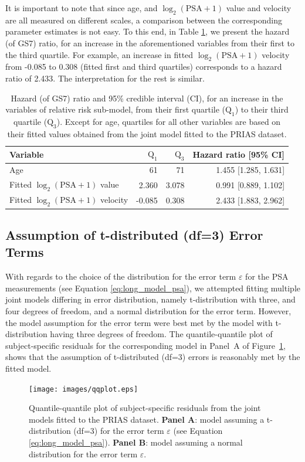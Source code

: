 It is important to note that since age, and ${\log_2 (\mbox{PSA} + 1)}$ value and velocity are all measured on different scales, a comparison between the corresponding parameter estimates is not easy. To this end, in Table \ref{tab:PSA_survival_easy}, we present the hazard (of GS7) ratio, for an increase in the aforementioned variables from their first to the third quartile. For example, an increase in fitted $\log_2 (\mbox{PSA} + 1)$ velocity from -0.085 to 0.308 (fitted first and third quartiles) corresponds to a hazard ratio of 2.433. The interpretation for the rest is similar.

\begin{table}[!htb]
\small\sf\centering
\caption{Hazard (of GS7) ratio and 95\% credible interval (CI), for an increase in the variables of relative risk sub-model, from their first quartile ($\mbox{Q}_1$) to their third quartile ($\mbox{Q}_3$). Except for age, quartiles for all other variables are based on their fitted values obtained from the joint model fitted to the PRIAS dataset.}
\label{tab:PSA_survival_easy}
\begin{tabular}{lrrr}
\hline
Variable                      & $\mbox{Q}_1$   & $\mbox{Q}_3$ & Hazard ratio [95\% CI] \\
\hline
Age & 61 & 71 & 1.455 [1.285, 1.631] \\
Fitted $\log_2 (\mbox{PSA} + 1)$ value & 2.360 & 3.078 & 0.991 [0.889, 1.102] \\
Fitted $\log_2 (\mbox{PSA} + 1)$ velocity & -0.085 & 0.308 & 2.433 [1.883, 2.962] \\
\hline
\end{tabular}
\end{table}

\subsection{Assumption of t-distributed (df=3) Error Terms}
\label{subsec:t-dist-assumption}
With regards to the choice of the distribution for the error term $\varepsilon$ for the PSA measurements (see Equation \ref{eq:long_model_psa}), we attempted fitting multiple joint models differing in error distribution, namely t-distribution with three, and four degrees of freedom, and a normal distribution for the error term. However, the model assumption for the error term were best met by the model with t-distribution having three degrees of freedom. The quantile-quantile plot of subject-specific residuals for the corresponding model in Panel~A of Figure~\ref{fig:qqplot}, shows that the assumption of t-distributed (df=3) errors is reasonably met by the fitted model. 

\begin{figure}[!htb]
\centerline{\texttt{[image: images/qqplot.eps]}}
\caption{Quantile-quantile plot of subject-specific residuals from the joint models fitted to the PRIAS dataset. \textbf{Panel A}: model assuming a t-distribution (df=3) for the error term $\varepsilon$ (see Equation \ref{eq:long_model_psa}). \textbf{Panel B}: model assuming a normal distribution for the error term $\varepsilon$.}
\label{fig:qqplot}
\end{figure}
